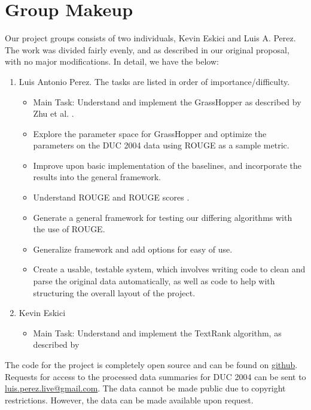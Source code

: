 \documentclass[11pt]{article}
\begin{document}
\section{Group Makeup}
Our project groups consists of two individuals, Kevin Eskici and Luis A. Perez. The work was divided fairly evenly, and as described in our original proposal, with no major modifications. In detail, we have the below:
\begin{enumerate}
\item Luis Antonio Perez. The tasks are listed in order of importance/difficulty.
\begin{itemize}
\item Main Task: Understand and implement the {\sc GrassHopper} as described by Zhu et al. \cite{grasshopper}. 
\item Explore the parameter space for {\sc GrassHopper} and optimize the parameters on the DUC 2004 data using ROUGE as a sample metric. 
\item Improve upon basic implementation of the baselines, and incorporate the results into the general framework.
\item Understand ROUGE and ROUGE scores \cite{rouge}.
\item Generate a general framework for testing our differing algorithms with the use of ROUGE.
\item Generalize framework and add options for easy of use.
\item Create a usable, testable system, which involves writing code to clean and parse the original data automatically, as well as code to help with structuring the overall layout of the project.
\end{itemize}
\item Kevin Eskici
\begin{itemize}
\item Main Task: Understand and implement the {\sc TextRank} algorithm, as described by 
\end{itemize}
\end{enumerate}
The code for the project is completely open source and can be found on \href{https://github.com/kandluis/document_summaries}{github}. Requests for access to the processed data summaries for DUC 2004 can be sent to \href{mailto:luis.perez.live@gmail.com}{luis.perez.live@gmail.com}. The data cannot be made public due to copyright restrictions. However, the data can be made available upon request.


 

\end{document}

